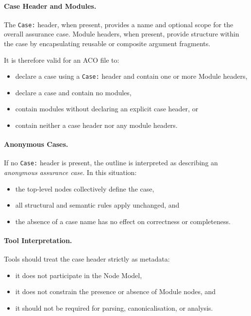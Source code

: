 \documentclass[11pt]{article}
\begin{document}
\paragraph{Case Header and Modules.}
The \texttt{Case:} header, when present, provides a name and optional scope for the overall
assurance case. Module headers, when present, provide structure within the case by encapsulating
reusable or composite argument fragments.

It is therefore valid for an ACO file to:
\begin{itemize}[leftmargin=2em]
  \item declare a case using a \texttt{Case:} header and contain one or more Module headers,
  \item declare a case and contain no modules,
  \item contain modules without declaring an explicit case header, or
  \item contain neither a case header nor any module headers.
\end{itemize}

\paragraph{Anonymous Cases.}
If no \texttt{Case:} header is present, the outline is interpreted as describing an
\emph{anonymous assurance case}. In this situation:
\begin{itemize}[leftmargin=2em]
  \item the top-level nodes collectively define the case,
  \item all structural and semantic rules apply unchanged, and
  \item the absence of a case name has no effect on correctness or completeness.
\end{itemize}

\paragraph{Tool Interpretation.}
Tools should treat the case header strictly as metadata:
\begin{itemize}[leftmargin=2em]
  \item it does not participate in the Node Model,
  \item it does not constrain the presence or absence of Module nodes, and
  \item it should not be required for parsing, canonicalisation, or analysis.
\end{itemize}
\end{document}
